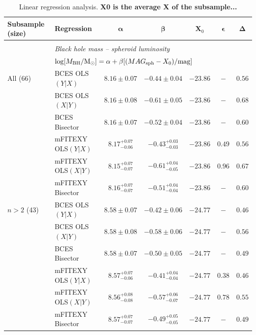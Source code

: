 \documentclass[preprint2]{emulateapj}
\begin{document}
\begin{table}
\centering
\caption{Linear regression analysis. {\bf X0 is the average X of the subsample...}}
\begin{tabular}{llccccc}
\hline
\hline
{\bf Subsample (size)} & {\bf Regression} & $\boldsymbol \alpha$ & $\boldsymbol \beta$ & $\boldsymbol X_0$ & $\boldsymbol \epsilon$ & $\boldsymbol \Delta$ \\ 
\hline 
\\
 & \multicolumn{6}{l}{\emph{Black hole mass -- spheroid luminosity}} \\
 & \multicolumn{6}{l}{$\log[M_{\rm BH}/{\rm M_\odot}] = \alpha + \beta[(MAG_{\rm sph} - X_0)/{\rm mag}]$} \\ [0.5em]
All (66)	       & BCES OLS$(Y|X)$   & $8.16 \pm 0.07$ & $-0.44 \pm 0.04$ & $-23.86$ & $-$ & $0.56$ \\
		       & BCES OLS$(X|Y)$   & $8.16 \pm 0.08$ & $-0.61 \pm 0.05$ & $-23.86$ & $-$ & $0.68$ \\
		       & BCES Bisector     & $8.16 \pm 0.07$ & $-0.52 \pm 0.04$ & $-23.86$ & $-$ & $0.60$ \\
		       & mFITEXY OLS$(Y|X)$ & $8.17^{+0.07}_{-0.06}$ & $-0.43^{+0.03}_{-0.03}$ & $-23.86$ & $0.49$ & $0.56$ \\
		       & mFITEXY OLS$(X|Y)$ & $8.15^{+0.07}_{-0.07}$ & $-0.61^{+0.04}_{-0.05}$ & $-23.86$ & $0.96$ & $0.67$ \\
		       & mFITEXY Bisector   & $8.16^{+0.07}_{-0.07}$ & $-0.51^{+0.04}_{-0.04}$ & $-23.86$ & $-$    & $0.60$ \\

$n>2$ (43)	       & BCES OLS$(Y|X)$   & $8.58 \pm 0.07$ & $-0.42 \pm 0.06$ & $-24.77$ & $-$ & $0.46$ \\
		       & BCES OLS$(X|Y)$   & $8.58 \pm 0.08$ & $-0.58 \pm 0.06$ & $-24.77$ & $-$ & $0.56$ \\
		       & BCES Bisector     & $8.58 \pm 0.07$ & $-0.50 \pm 0.05$ & $-24.77$ & $-$ & $0.49$ \\
		       & mFITEXY OLS$(Y|X)$ & $8.57^{+0.07}_{-0.06}$ & $-0.41^{+0.04}_{-0.04}$ & $-24.77$ & $0.38$ & $0.46$ \\
		       & mFITEXY OLS$(X|Y)$ & $8.56^{+0.08}_{-0.08}$ & $-0.57^{+0.06}_{-0.07}$ & $-24.77$ & $0.78$ & $0.55$ \\
		       & mFITEXY Bisector   & $8.57^{+0.07}_{-0.07}$ & $-0.49^{+0.05}_{-0.05}$ & $-24.77$ & $-$    & $0.49$ \\
		   

\end{tabular}
\end{table}
\end{document}
